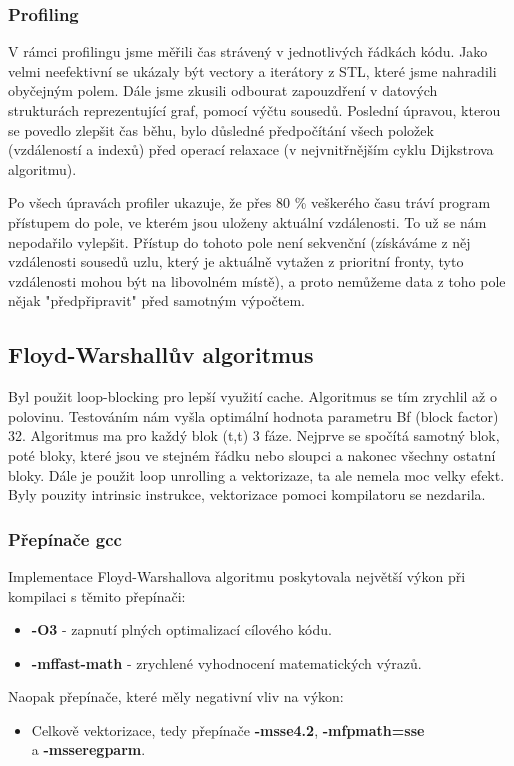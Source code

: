 \documentclass[a4paper,11pt]{article}
\begin{document}
\subsubsection{Profiling}
V rámci profilingu jsme měřili čas strávený v jednotlivých řádkách kódu. Jako velmi neefektivní se ukázaly být vectory a iterátory z STL, které jsme nahradili obyčejným polem. Dále jsme zkusili odbourat zapouzdření v datových strukturách reprezentující graf, pomocí výčtu sousedů. Poslední úpravou, kterou se povedlo zlepšit čas běhu, bylo důsledné předpočítání všech položek (vzdáleností a indexů) před operací relaxace (v nejvnitřnějším cyklu Dijk\-strova algoritmu).
\par
Po všech úpravách profiler ukazuje, že přes 80 \% veškerého času tráví program přístupem do pole, ve kterém jsou uloženy aktuální vzdálenosti. To už se nám nepodařilo vylepšit. Přístup do tohoto pole není sekvenční (získáváme z něj vzdálenosti sousedů uzlu, který je aktuálně vytažen z prioritní fronty, tyto vzdálenosti mohou být na libovolném místě), a proto nemůžeme data z toho pole nějak "předpřipravit" před samotným výpočtem.

\subsection{Floyd-Warshallův algoritmus}
Byl použit loop-blocking pro lepší využití cache. Algoritmus se tím zrychlil až o polovinu. Testováním nám vyšla optimální hodnota parametru Bf (block factor) 32. Algoritmus ma pro každý blok (t,t) 3 fáze. Nejprve se spočítá samotný blok, poté bloky, které jsou ve stejném řádku nebo sloupci a nakonec všechny ostatní bloky. Dále je použit loop unrolling a vektorizaze, ta ale nemela moc velky efekt. Byly pouzity intrinsic instrukce, vektorizace pomoci kompilatoru se nezdarila.

\subsubsection{Přepínače gcc}
Implementace Floyd-Warshallova algoritmu poskytovala největší výkon při kompilaci s těmito přepínači:
\begin{itemize}
 \item \textbf{-O3} - zapnutí plných optimalizací cílového kódu.
 \item \textbf{-mffast-math} - zrychlené vyhodnocení matematických výrazů.
\end{itemize}
Naopak přepínače, které měly negativní vliv na výkon:
\begin{itemize}
  \item Celkově vektorizace, tedy přepínače \textbf{-msse4.2}, \textbf{-mfpmath=sse} \\a \textbf{-msseregparm}.
\end{itemize}
\end{document}
